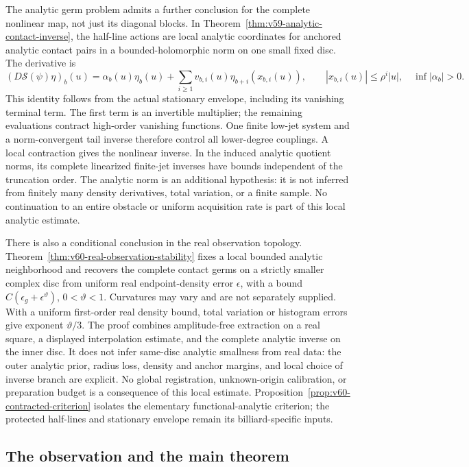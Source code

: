 The analytic germ problem admits a further conclusion for the complete
nonlinear map, not just its diagonal blocks.  In
Theorem~\ref{thm:v59-analytic-contact-inverse}, the half-line actions
are local analytic coordinates for anchored analytic contact pairs in a
bounded-holomorphic norm on one small fixed disc.  The derivative is
\[
 (D\mathscr S(\psi)\eta)_b(u)
 =\alpha_b(u)\eta_b(u)+
       \sum_{i\ge1}v_{b,i}(u)\eta_{b+i}(x_{b,i}(u)),
       \qquad |x_{b,i}(u)|\le\rho^i|u|,\quad \inf|\alpha_b|>0.
\]
This identity follows from the actual stationary envelope, including its
vanishing terminal term.  The first term is an invertible multiplier;
the remaining evaluations contract high-order vanishing functions.
One finite low-jet system and a norm-convergent tail inverse therefore
control all lower-degree couplings.  A local contraction gives the
nonlinear inverse.  In the induced analytic quotient norms, its complete
linearized finite-jet inverses have bounds independent of the truncation
order.  The analytic norm is an additional hypothesis: it is not inferred
from finitely many density derivatives, total variation, or a finite
sample.  No continuation to an entire obstacle or uniform acquisition
rate is part of this local analytic estimate.

There is also a conditional conclusion in the real observation topology.
Theorem~\ref{thm:v60-real-observation-stability} fixes a local bounded
analytic neighborhood and recovers the complete contact germs on a
strictly smaller complex disc from uniform real endpoint-density error
$\epsilon$, with a bound $C(\epsilon_g+\epsilon^\vartheta)$,
$0<\vartheta<1$.  Curvatures may vary and are not separately supplied.
With a uniform first-order real density bound, total variation or
histogram errors give exponent $\vartheta/3$.  The proof combines
amplitude-free extraction on a real square, a displayed interpolation
estimate, and the complete analytic inverse on the inner disc.
It does not infer same-disc analytic smallness from real data: the
outer analytic prior, radius loss, density and anchor margins, and
local choice of inverse branch are explicit.  No global registration,
unknown-origin calibration, or preparation budget is a consequence of
this local estimate.  Proposition~\ref{prop:v60-contracted-criterion}
isolates the elementary functional-analytic criterion; the protected
half-lines and stationary envelope remain its billiard-specific inputs.


\subsection{The observation and the main theorem}

